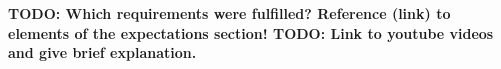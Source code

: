 \textbf{TODO: Which requirements were fulfilled? Reference (link) to elements of the expectations section! TODO: Link to youtube videos and give brief explanation.}